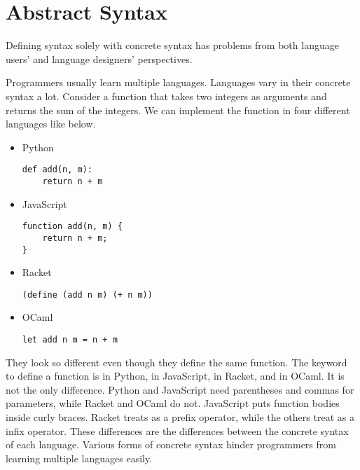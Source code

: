 \section{Abstract Syntax}

Defining syntax solely with concrete syntax has problems from both language
users' and language designers' perspectives.

Programmers usually learn multiple languages. Languages vary in their concrete
syntax a lot. Consider a function that takes two integers as arguments and
returns the sum of the integers. We can implement the function in four different
languages like below.

\begin{itemize}
  \item Python

\begin{verbatim}
def add(n, m):
    return n + m
\end{verbatim}

  \item JavaScript

\begin{verbatim}
function add(n, m) {
    return n + m;
}
\end{verbatim}

  \item Racket

\begin{verbatim}
(define (add n m) (+ n m))
\end{verbatim}

  \item OCaml

\begin{verbatim}
let add n m = n + m
\end{verbatim}
\end{itemize}

They look so different even though they define the same function. The
keyword to define a function is  in Python,  in
JavaScript,  in Racket, and  in OCaml. It is not
the only difference. Python and JavaScript need parentheses and commas
for parameters, while Racket and OCaml do not. JavaScript puts function
bodies inside curly braces. Racket treats \code{+} as a prefix operator,
while the others treat \code{+} as a infix operator. These differences
are the differences between the concrete syntax of each language.
Various forms of concrete syntax hinder programmers from learning
multiple languages easily.

